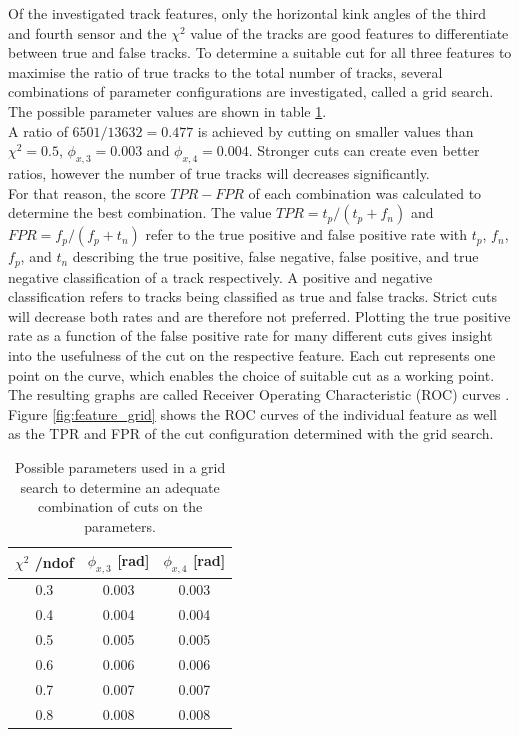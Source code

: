 Of the investigated track features, only the horizontal kink angles of the third and fourth sensor and the $\chi^2$ value of the tracks are good
features to differentiate between true and false tracks. To determine a suitable
cut for all three features to maximise the ratio of true tracks to the total number of tracks, several combinations of parameter configurations are investigated, called a
grid search.
The possible parameter values are shown in table \ref{tab:params}. \\
A ratio of $6501/13632 = 0.477$ is achieved by cutting on smaller values
than $\chi^2 = 0.5$, $\phi_{x,3} = 0.003$ and $\phi_{x,4}=0.004$.
Stronger cuts can create even better ratios, however the number of true tracks will decreases significantly. \\
For that reason, the score $TPR-FPR$ of each combination
was calculated to determine the best combination. The value $TPR = t_p/(t_p + f_n)$ and $FPR = f_p/(f_p + t_n)$
refer to the true positive and false positive rate with
$t_p$, $f_n$, $f_p$, and $t_n$ describing the true positive, false negative, false positive, and true negative classification of a track respectively.
A positive and negative classification refers to tracks being classified as true and false tracks.
Strict cuts will decrease both rates and are therefore not preferred. Plotting the
true positive rate as a function of the false positive rate for many different cuts gives insight into the usefulness of the cut on the respective feature. Each cut
represents one point on the curve, which enables the choice of suitable cut as a working point.
The resulting
graphs are called Receiver Operating Characteristic (ROC) curves \cite{roc}.
Figure \ref{fig:feature_grid} shows the ROC curves of the individual feature as well as the TPR and FPR of the cut configuration determined with the grid search.

\begin{table}
  \centering
  \begin{tabular}{c c c}
    \toprule
    $\chi^2$ /ndof & $\phi_{x,3}$ [rad] & $\phi_{x,4}$ [rad]\\
    \midrule
    0.3 & 0.003 & 0.003 \\
    0.4 & 0.004 & 0.004 \\
    0.5 & 0.005 & 0.005 \\
    0.6 & 0.006 & 0.006 \\
    0.7 & 0.007 & 0.007 \\
    0.8 & 0.008 & 0.008
  \end{tabular}
  \caption{Possible parameters used in a grid search to determine an adequate combination of cuts on the parameters.}
  \label{tab:params}
\end{table}



